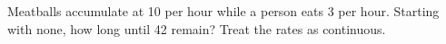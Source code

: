 Meatballs accumulate at 10 per hour while a person eats 3 per hour. Starting with none, how long until 42 remain? Treat the rates as continuous.
